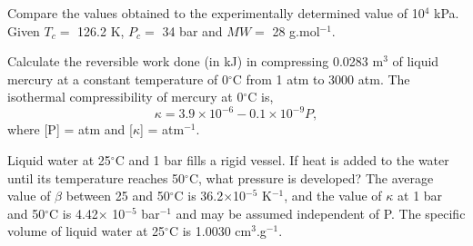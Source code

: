 \begin{MyTutorial}{}
\begin{problem}
\begin{enumerate}
        \end{enumerate} 
     Compare the values obtained to the experimentally determined value of 10$^{4}$ kPa. Given $T_{c}=$ 126.2 K, $P_{c}=$ 34 bar and $MW=$ 28 g.mol$^{-1}$.
  \end{problem}
%
  \begin{problem}\label{Chapter:VolumetricPropertiesPureSubstances:Problem:03}\citep{SmithVanNess_Book} %
     Calculate the reversible work done (in kJ) in compressing 0.0283 m$^{3}$ of liquid mercury at a constant temperature of  0$^{\circ}$C from 1 atm to 3000 atm. The isothermal compressibility of mercury at 0$^{\circ}$C is,
     \begin{displaymath}
          \kappa = 3.9\times10^{-6} - 0.1\times 10^{-9}P,
     \end{displaymath}
where [P] = atm and [$\kappa$] = atm$^{-1}$.
  \end{problem}
%
  \begin{problem}\label{Chapter:VolumetricPropertiesPureSubstances:Problem:04} 
     Liquid water at 25$^{\circ}$C and 1 bar fills a rigid vessel. If heat is added to the water until its temperature reaches 50$^{\circ}$C, what pressure is developed? The average value of $\beta$ between 25 and 50$^{\circ}$C is 36.2$\times$10$^{-5}$ K$^{-1}$, and the value of $\kappa$ at 1 bar and 50$^{\circ}$C is 4.42$\times$ 10$^{-5}$ bar$^{-1}$  and may be assumed independent of P. The specific volume of liquid water at 25$^{\circ}$C  is 1.0030 cm$^{3}$.g$^{-1}$.
  \end{problem}
%
\end{MyTutorial}
